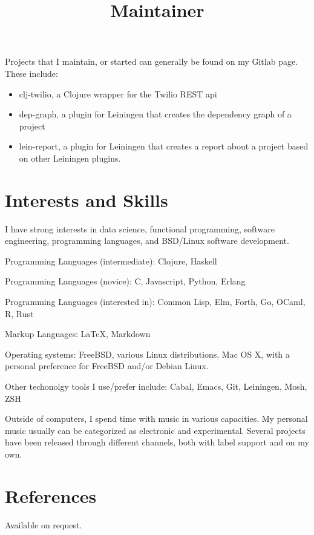 \documentclass[margintitle,line]{res}
\begin{document}
\begin{resume}
\title{Maintainer}
\begin{position}
Projects that I maintain, or started can generally be found on my
Gitlab page. These include:
\begin{itemize}
\item{clj-twilio, a Clojure wrapper for the Twilio REST api}
\item{dep-graph, a plugin for Leiningen that creates the dependency
    graph of a project}
\item{lein-report, a plugin for Leiningen that creates a report about
    a project based on other Leiningen plugins.}
\end{itemize}
\end{position}


\section{Interests and Skills}

I have strong interests in data science, functional programming,
software engineering, programming languages, and BSD/Linux software development.

Programming Languages (intermediate): Clojure, Haskell

Programming Languages (novice): C, Javascript, Python, Erlang

Programming Languages (interested in): Common Lisp, Elm, Forth,
Go, OCaml, R, Rust

Markup Languages: LaTeX, Markdown

Operating systems: FreeBSD, various Linux distributions, Mac OS X, with a personal
preference for FreeBSD and/or Debian Linux.

Other techonolgy tools I use/prefer include: Cabal, Emacs, Git, Leiningen, Mosh, ZSH

Outside of computers, I spend time with music in various
capacities. My personal music usually can be categorized as electronic
and experimental. Several projects have been released through
different channels, both with label support and on my own.

\section{References}

Available on request.

\end{resume}
\end{document}
